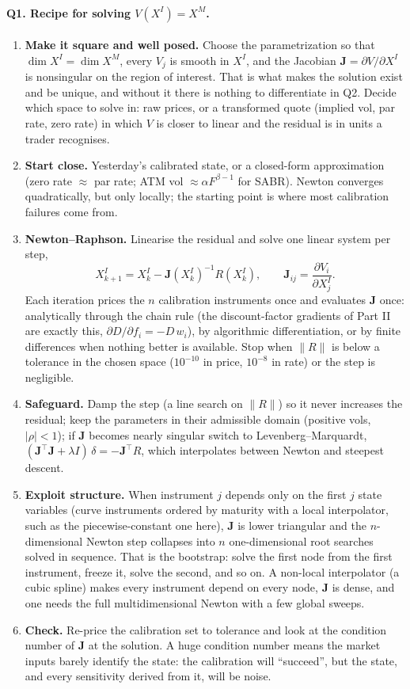 \documentclass[11pt]{article}
\newcommand{\XI}{X^{I}}
\newcommand{\XM}{X^{M}}
\newcommand{\J}{\mathbf{J}}
\begin{document}
\paragraph{Q1. Recipe for solving $V(\XI)=\XM$.}
\begin{enumerate}[leftmargin=*]
\item \textbf{Make it square and well posed.} Choose the parametrization so that $\dim\XI=\dim\XM$, every $V_j$ is smooth in $\XI$, and the Jacobian $\J=\partial V/\partial\XI$ is nonsingular on the region of interest. That is what makes the solution exist and be unique, and without it there is nothing to differentiate in Q2. Decide which space to solve in: raw prices, or a transformed quote (implied vol, par rate, zero rate) in which $V$ is closer to linear and the residual is in units a trader recognises.
\item \textbf{Start close.} Yesterday's calibrated state, or a closed-form approximation (zero rate $\approx$ par rate; ATM vol $\approx\alpha F^{\beta-1}$ for SABR). Newton converges quadratically, but only locally; the starting point is where most calibration failures come from.
\item \textbf{Newton--Raphson.} Linearise the residual and solve one linear system per step,
\[
\XI_{k+1}=\XI_k-\J(\XI_k)^{-1}R(\XI_k),
\qquad
\J_{ij}=\frac{\partial V_i}{\partial X^I_j}.
\]
Each iteration prices the $n$ calibration instruments once and evaluates $\J$ once: analytically through the chain rule (the discount-factor gradients of Part II are exactly this, $\partial D/\partial f_i=-D\,w_i$), by algorithmic differentiation, or by finite differences when nothing better is available. Stop when $\|R\|$ is below a tolerance in the chosen space ($10^{-10}$ in price, $10^{-8}$ in rate) or the step is negligible.
\item \textbf{Safeguard.} Damp the step (a line search on $\|R\|$) so it never increases the residual; keep the parameters in their admissible domain (positive vols, $|\rho|<1$); if $\J$ becomes nearly singular switch to Levenberg--Marquardt, $(\J^{\top}\J+\lambda I)\,\delta=-\J^{\top}R$, which interpolates between Newton and steepest descent.
\item \textbf{Exploit structure.} When instrument $j$ depends only on the first $j$ state variables (curve instruments ordered by maturity with a local interpolator, such as the piecewise-constant one here), $\J$ is lower triangular and the $n$-dimensional Newton step collapses into $n$ one-dimensional root searches solved in sequence. That is the bootstrap: solve the first node from the first instrument, freeze it, solve the second, and so on. A non-local interpolator (a cubic spline) makes every instrument depend on every node, $\J$ is dense, and one needs the full multidimensional Newton with a few global sweeps.
\item \textbf{Check.} Re-price the calibration set to tolerance and look at the condition number of $\J$ at the solution. A huge condition number means the market inputs barely identify the state: the calibration will ``succeed'', but the state, and every sensitivity derived from it, will be noise.
\end{enumerate}
\end{document}
